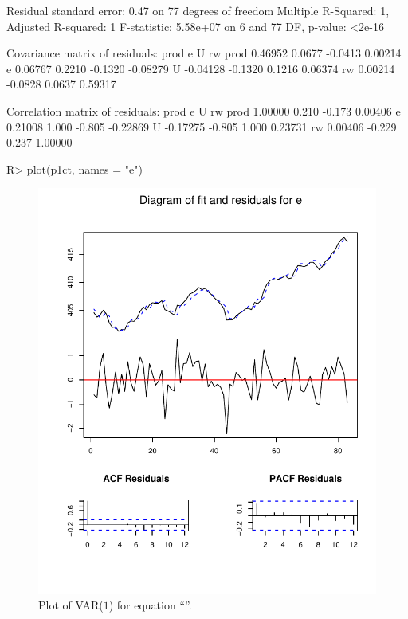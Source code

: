\documentclass[nojss]{jss}
\begin{document}
\begin{Schunk}
\begin{Soutput}
Residual standard error: 0.47 on 77 degrees of freedom
Multiple R-Squared:    1,	Adjusted R-squared:    1 
F-statistic: 5.58e+07 on 6 and 77 DF,  p-value: <2e-16 



Covariance matrix of residuals:
         prod       e       U       rw
prod  0.46952  0.0677 -0.0413  0.00214
e     0.06767  0.2210 -0.1320 -0.08279
U    -0.04128 -0.1320  0.1216  0.06374
rw    0.00214 -0.0828  0.0637  0.59317

Correlation matrix of residuals:
         prod      e      U       rw
prod  1.00000  0.210 -0.173  0.00406
e     0.21008  1.000 -0.805 -0.22869
U    -0.17275 -0.805  1.000  0.23731
rw    0.00406 -0.229  0.237  1.00000
\end{Soutput}
\begin{Sinput}
R> plot(p1ct, names = "e")
\end{Sinput}
\end{Schunk}
%
\begin{figure}[p]
\centering  
\includegraphics{Figures/fig-2}
\caption{Plot of VAR($1$) for equation ``''.}
\label{fig-2}
\end{figure}
\end{document}
